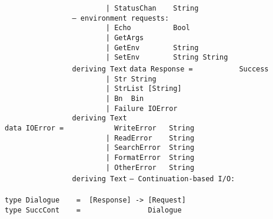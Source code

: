 \mbox{\tt \ \ \ \ \ \ \ \ \ \ \ \ \ \ \ \ \ \ \ \ \ \ \ \ |\ StatusChan\ \ \ \ String}\\
\mbox{\tt \ \ \ \ \ \ \ \ \ \ \ \ \ \ \ \ --\ environment\ requests:}\\
\mbox{\tt \ \ \ \ \ \ \ \ \ \ \ \ \ \ \ \ \ \ \ \ \ \ \ \ |\ Echo\ \ \ \ \ \ \ \ \ \ Bool}\\
\mbox{\tt \ \ \ \ \ \ \ \ \ \ \ \ \ \ \ \ \ \ \ \ \ \ \ \ |\ GetArgs}\\
\mbox{\tt \ \ \ \ \ \ \ \ \ \ \ \ \ \ \ \ \ \ \ \ \ \ \ \ |\ GetEnv\ \ \ \ \ \ \ \ String}\\
\mbox{\tt \ \ \ \ \ \ \ \ \ \ \ \ \ \ \ \ \ \ \ \ \ \ \ \ |\ SetEnv\ \ \ \ \ \ \ \ String\ String}\\
\mbox{\tt \ \ \ \ \ \ \ \ \ \ \ \ \ \ \ \ deriving\ Text}
%
\eprogB\noindent\bprogB
\mbox{\tt data\ Response\ =\ \ \ \ \ \ \ \ \ \ \ Success}\\
\mbox{\tt \ \ \ \ \ \ \ \ \ \ \ \ \ \ \ \ \ \ \ \ \ \ \ \ |\ Str\ String\ }\\
\mbox{\tt \ \ \ \ \ \ \ \ \ \ \ \ \ \ \ \ \ \ \ \ \ \ \ \ |\ StrList\ [String]}\\
\mbox{\tt \ \ \ \ \ \ \ \ \ \ \ \ \ \ \ \ \ \ \ \ \ \ \ \ |\ Bn\ \ Bin}\\
\mbox{\tt \ \ \ \ \ \ \ \ \ \ \ \ \ \ \ \ \ \ \ \ \ \ \ \ |\ Failure\ IOError}\\
\mbox{\tt \ \ \ \ \ \ \ \ \ \ \ \ \ \ \ \ deriving\ Text}
%
\eprogB\noindent\bprogB
\mbox{\tt data\ IOError\ =\ \ \ \ \ \ \ \ \ \ \ \ WriteError\ \ \ String}\\
\mbox{\tt \ \ \ \ \ \ \ \ \ \ \ \ \ \ \ \ \ \ \ \ \ \ \ \ |\ ReadError\ \ \ \ String}\\
\mbox{\tt \ \ \ \ \ \ \ \ \ \ \ \ \ \ \ \ \ \ \ \ \ \ \ \ |\ SearchError\ \ String}\\
\mbox{\tt \ \ \ \ \ \ \ \ \ \ \ \ \ \ \ \ \ \ \ \ \ \ \ \ |\ FormatError\ \ String}\\
\mbox{\tt \ \ \ \ \ \ \ \ \ \ \ \ \ \ \ \ \ \ \ \ \ \ \ \ |\ OtherError\ \ \ String}\\
\mbox{\tt \ \ \ \ \ \ \ \ \ \ \ \ \ \ \ \ deriving\ Text}
%
\eprogB\noindent\bprogB
\mbox{\tt --\ Continuation-based\ I/O:}\\
\mbox{\tt }\\[-8pt]
\mbox{\tt type\ Dialogue\ \ \ \ =\ \ [Response]\ ->\ [Request]}\\
\mbox{\tt type\ SuccCont\ \ \ \ =\ \ \ \ \ \ \ \ \ \ \ \ \ \ \ \ Dialogue}\\
